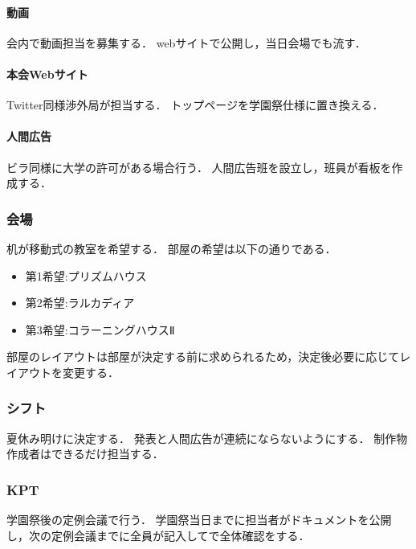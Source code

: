 \paragraph{動画}
会内で動画担当を募集する．
webサイトで公開し，当日会場でも流す．

\paragraph{本会Webサイト}
Twitter同様渉外局が担当する．
トップページを学園祭仕様に置き換える．

\paragraph{人間広告}         
ビラ同様に大学の許可がある場合行う．
人間広告班を設立し，班員が看板を作成する．

\subsubsection*{会場}
机が移動式の教室を希望する．
部屋の希望は以下の通りである．
\begin{itemize}
    \item 第1希望:プリズムハウス
    \item 第2希望:ラルカディア
    \item 第3希望:コラーニングハウスⅡ
\end{itemize}
部屋のレイアウトは部屋が決定する前に求められるため，決定後必要に応じてレイアウトを変更する．

\subsubsection*{シフト}
夏休み明けに決定する．
発表と人間広告が連続にならないようにする．
制作物作成者はできるだけ担当する．

\subsubsection*{KPT}
学園祭後の定例会議で行う．
学園祭当日までに担当者がドキュメントを公開し，次の定例会議までに全員が記入してで全体確認をする．

